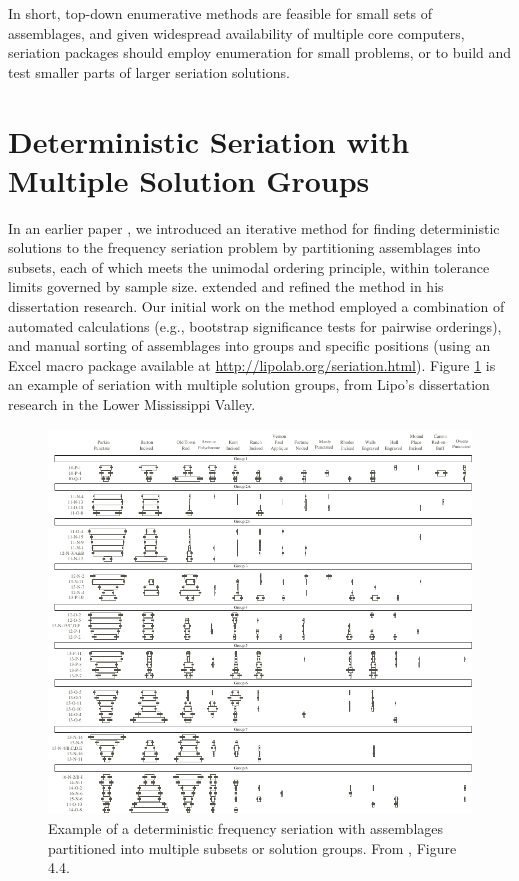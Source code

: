 \documentclass[preprint,times,authoryear,12pt]{els-workingpaper}
\begin{document}
In short, top-down enumerative methods are feasible for small sets of assemblages, and given widespread availability of multiple core computers, seriation packages should employ enumeration for small problems, or to build and test smaller parts of larger seriation solutions.  

\section{Deterministic Seriation with Multiple Solution Groups}
\label{sec:seriation-groups}



In an earlier paper \citep{Lipo1997}, we introduced an iterative method for finding deterministic solutions to the frequency seriation problem by partitioning assemblages into subsets, each of which meets the unimodal ordering principle, within tolerance limits governed by sample size.  \citet{Lipo2001b} extended and refined the method in his dissertation research.  Our initial work on the method employed a combination of automated calculations (e.g., bootstrap significance tests for pairwise orderings), and manual sorting of assemblages into groups and specific positions (using an Excel macro package available at \url{http://lipolab.org/seriation.html}).  Figure \ref{fig:mult-seriation-groups} is an example of seriation with multiple solution groups, from Lipo's dissertation research in the Lower Mississippi Valley.  

\begin{figure}
	\includegraphics[scale=0.75]{lipo-figure-4-4.pdf}
	\caption{Example of a deterministic frequency seriation with assemblages partitioned into multiple subsets or solution groups.  From \citet{Lipo2001b}, Figure 4.4.}
	\label{fig:mult-seriation-groups}
\end{figure}
\end{document}
